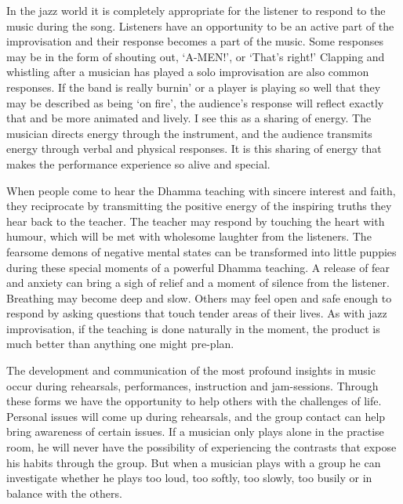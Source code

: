 In the jazz world it is completely appropriate for the listener to
respond to the music during the song. Listeners have an opportunity to
be an active part of the improvisation and their response becomes a part
of the music. Some responses may be in the form of shouting out, 
`A-MEN!', or `That's right!' Clapping and whistling after a
musician has played a solo improvisation are also common responses. If
the band is really burnin' or a player is playing so well that they
may be described as being `on fire', the audience's response will
reflect exactly that and be more animated and lively. I see this as a
sharing of energy. The musician directs energy through the instrument, 
and the audience transmits energy through verbal and physical responses. 
It is this sharing of energy that makes the performance experience so
alive and special. 

When people come to hear the Dhamma teaching with sincere interest and
faith, they reciprocate by transmitting the positive energy of the
inspiring truths they hear back to the teacher. The teacher may respond
by touching the heart with humour, which will be met with wholesome
laughter from the listeners. The fearsome demons of negative mental
states can be transformed into little puppies during these special
moments of a powerful Dhamma teaching. A release of fear and anxiety can
bring a sigh of relief and a moment of silence from the listener. 
Breathing may become deep and slow. Others may feel open and safe enough
to respond by asking questions that touch tender areas of their lives. 
As with jazz improvisation, if the teaching is done naturally in the
moment, the product is much better than anything one might pre-plan. 

The development and communication of the most profound insights in music
occur during rehearsals, performances, instruction and jam-sessions. 
Through these forms we have the opportunity to help others with the
challenges of life. Personal issues will come up during rehearsals, and
the group contact can help bring awareness of certain issues. If a
musician only plays alone in the practise room, he will never have the
possibility of experiencing the contrasts that expose his habits through
the group. But when a musician plays with a group he can investigate
whether he plays too loud, too softly, too slowly, too busily or in balance
with the others. 

